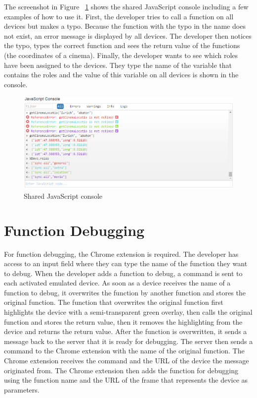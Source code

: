 The screenshot in Figure ~\ref{fig:js_console} shows the shared JavaScript console including a few examples of how to use it. First, the developer tries to call a function on all devices but makes a typo. Because the function with the typo in the name does not exist, an error message is displayed by all devices. The developer then notices the typo, types the correct function and sees the return value of the functions (the coordinates of a cinema). Finally, the developer wants to see which roles have been assigned to the devices. They type the name of the variable that contains the roles and the value of this variable on all devices is shown in the console.

\begin{figure}[H]
  \centering
    \includegraphics[width=1.0\textwidth]{images/screenshots/js_console_2.png}
	\caption{Shared JavaScript console}
	\label{fig:js_console}
\end{figure}

\section{Function Debugging}

For function debugging, the Chrome extension is required. The developer has access to an input field where they can type the name of the function they want to debug. When the developer adds a function to debug, a command is sent to each activated emulated device. As soon as a device receives the name of a function to debug, it overwrites the function by another function and stores the original function. The function that overwrites the original function first highlights the device with a semi-transparent green overlay, then calls the original function and stores the return value, then it removes the highlighting from the device and returns the return value. After the function is overwritten, it sends a message back to the server that it is ready for debugging. The server then sends a command to the Chrome extension with the name of the original function. The Chrome extension receives the command and the URL of the device the message originated from. The Chrome extension then adds the function for debugging using the function name and the URL of the frame that represents the device as parameters. 

